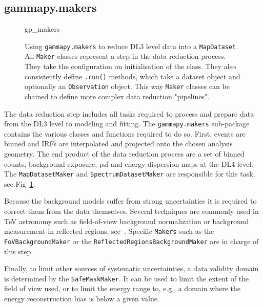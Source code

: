 \documentclass[traditabstract, longauth]{aa}
\newcommand{\code}[1]{\texttt{#1}}
\begin{document}
\subsection{gammapy.makers}
\label{ssec:gammapy-makers}
%
\begin{figure}
	\small
    {gp_makers}
	\caption{
        Using \code{gammapy.makers} to reduce DL3 level data into a
		\code{MapDataset}. All \code{Maker} classes represent 
		a step in the data reduction process. They take
        the configuration on initialisation of the class. They 
		also consistently define \code{.run()} methods, which take
		a dataset object and optionally an \code{Observation} 
		object. This way \code{Maker} classes can be chained
		to define more complex data reduction "pipelines".
    }
	\label{ig*:minted:gp_makers}
\end{figure}
%
The data reduction step includes all tasks required to process and prepare
\gammaray data from the DL3 level to modeling and fitting. The \code{gammapy.makers} sub-package
contains the various classes and functions required to do so. First, events are
binned and IRFs are interpolated and projected onto the chosen analysis
geometry. The end product of the data reduction process are a set of binned counts,
background exposure, psf and energy dispersion maps at the DL4 level. 
The \code{MapDatasetMaker} and \code{SpectrumDatasetMaker} are
responsible for this task, see Fig~\ref{ig*:minted:gp_makers}.

Because the background models suffer from strong uncertainties it is required
to correct them from the data themselves. Several techniques are commonly used
in TeV \gammaray astronomy such as field-of-view background normalization or
background measurement in reflected regions, see~\cite{Berge07}.
Specific \code{Makers} such as the \code{FoVBackgroundMaker} or the
\code{ReflectedRegionsBackgroundMaker} are in charge of this step.

Finally, to limit other sources of systematic uncertainties, a data validity
domain is determined by the \code{SafeMaskMaker}. It can be used to limit the
extent of the field of view used, or to limit the energy range to, e.g., a domain
where the energy reconstruction bias is below a given value.
\end{document}
